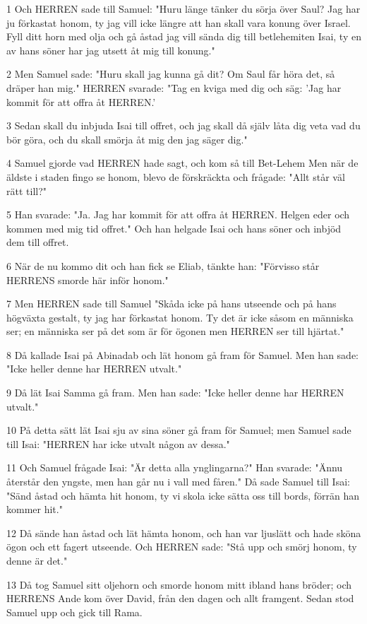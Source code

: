 \par 1 Och HERREN sade till Samuel: "Huru länge tänker du sörja över Saul? Jag har ju förkastat honom, ty jag vill icke längre att han skall vara konung över Israel. Fyll ditt horn med olja och gå åstad jag vill sända dig till betlehemiten Isai, ty en av hans söner har jag utsett åt mig till konung."
\par 2 Men Samuel sade: "Huru skall jag kunna gå dit? Om Saul får höra det, så dräper han mig." HERREN svarade: "Tag en kviga med dig och säg: 'Jag har kommit för att offra åt HERREN.'
\par 3 Sedan skall du inbjuda Isai till offret, och jag skall då själv låta dig veta vad du bör göra, och du skall smörja åt mig den jag säger dig."
\par 4 Samuel gjorde vad HERREN hade sagt, och kom så till Bet-Lehem Men när de äldste i staden fingo se honom, blevo de förskräckta och frågade: "Allt står väl rätt till?"
\par 5 Han svarade: "Ja. Jag har kommit för att offra åt HERREN. Helgen eder och kommen med mig tid offret." Och han helgade Isai och hans söner och inbjöd dem till offret.
\par 6 När de nu kommo dit och han fick se Eliab, tänkte han: "Förvisso står HERRENS smorde här inför honom."
\par 7 Men HERREN sade till Samuel "Skåda icke på hans utseende och på hans högväxta gestalt, ty jag har förkastat honom. Ty det är icke såsom en människa ser; en människa ser på det som är för ögonen men HERREN ser till hjärtat."
\par 8 Då kallade Isai på Abinadab och lät honom gå fram för Samuel. Men han sade: "Icke heller denne har HERREN utvalt."
\par 9 Då lät Isai Samma gå fram. Men han sade: "Icke heller denne har HERREN utvalt."
\par 10 På detta sätt lät Isai sju av sina söner gå fram för Samuel; men Samuel sade till Isai: "HERREN har icke utvalt någon av dessa."
\par 11 Och Samuel frågade Isai: "Är detta alla ynglingarna?" Han svarade: "Ännu återstår den yngste, men han går nu i vall med fåren." Då sade Samuel till Isai: "Sänd åstad och hämta hit honom, ty vi skola icke sätta oss till bords, förrän han kommer hit."
\par 12 Då sände han åstad och lät hämta honom, och han var ljuslätt och hade sköna ögon och ett fagert utseende. Och HERREN sade: "Stå upp och smörj honom, ty denne är det."
\par 13 Då tog Samuel sitt oljehorn och smorde honom mitt ibland hans bröder; och HERRENS Ande kom över David, från den dagen och allt framgent. Sedan stod Samuel upp och gick till Rama.
